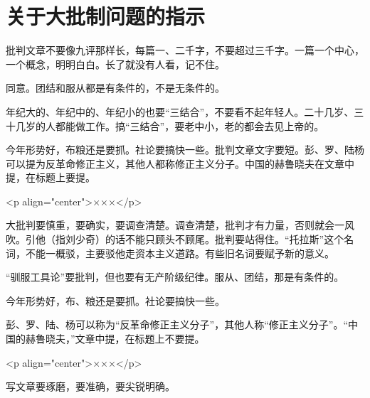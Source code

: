 \section[关于大批制问题的指示（一九六七年五月二日）]{关于大批制问题的指示}


批判文章不要像九评那样长，每篇一、二千字，不要超过三千字。一篇一个中心，一个概念，明明白白。长了就没有人看，记不住。

同意。团结和服从都是有条件的，不是无条件的。

年纪大的、年纪中的、年纪小的也要“三结合”，不要看不起年轻人。二十几岁、三十几岁的人都能做工作。搞“三结合”，要老中小，老的都会去见上帝的。

今年形势好，布粮还是要抓。社论要搞快一些。批判文章文字要短。彭、罗、陆杨可以提为反革命修正主义，其他人都称修正主义分子。中国的赫鲁晓夫在文章中提，在标题上要提。

<p align="center">×××</p>

大批判要慎重，要确实，要调查清楚。调查清楚，批判才有力量，否则就会一风吹。引他（指刘少奇）的话不能只顾头不顾尾。批判要站得住。“托拉斯”这个名词，不能一概驳，主要驳他走资本主义道路。有些旧名词要赋予新的意义。

“驯服工具论”要批判，但也要有无产阶级纪律。服从、团结，那是有条件的。

今年形势好，布、粮还是要抓。社论要搞快一些。

彭、罗、陆、杨可以称为“反革命修正主义分子”，其他人称“修正主义分子”。“中国的赫鲁晓夫，”文章中提，在标题上不要提。

<p align="center">×××</p>

写文章要琢磨，要准确，要尖锐明确。


